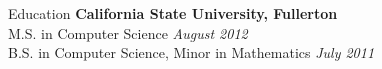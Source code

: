\documentclass{resume} %
\begin{document}

\begin{rSection}{Education}
{\bf California State University, Fullerton}  \\ 
M.S. in Computer Science \hfill {\em August 2012}\\
B.S. in Computer Science, Minor in Mathematics  \hfill {\em July 2011}\\
\end{rSection}






\end{document}
